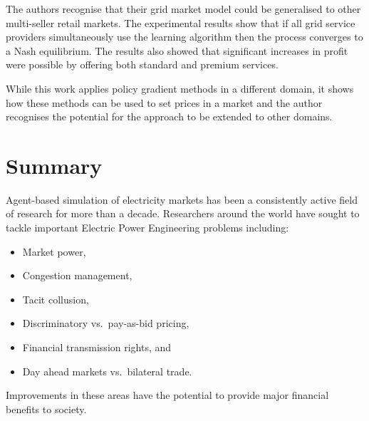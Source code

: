 The authors recognise that their grid market model could be generalised to
other multi-seller retail markets.  The experimental results show that if
all grid service providers simultaneously use the learning algorithm then the
process converges to a Nash equilibrium.  The results also showed that
significant increases in profit were possible by offering both standard and
premium services.

While this work applies policy gradient methods in a different domain, it shows
how these methods can be used to set prices in a market and the author
recognises the potential for the approach to be extended to other domains.



\section{Summary}
Agent-based simulation of electricity markets has been a consistently active
field of research for more than a decade.  Researchers around the world have
sought to tackle important Electric Power Engineering problems including:
\begin{itemize}
  \item Market power,
  \item Congestion management,
  \item Tacit collusion,
  \item Discriminatory vs.~pay-as-bid pricing,
  \item Financial transmission rights, and
  \item Day ahead markets vs.~bilateral trade.
\end{itemize}
Improvements in these areas have the potential to provide major financial
benefits to society.

